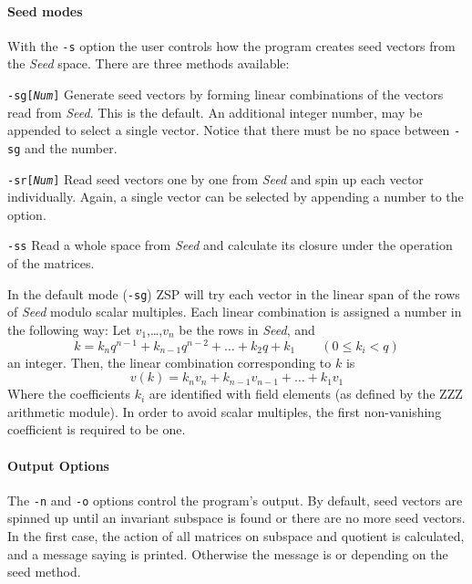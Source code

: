 \paragraph{Seed modes}
With the {\tt -s} option the user controls how the program creates
seed vectors from the {\it Seed} space. There are three methods
available:
\begin{list}{}{ \leftmargin 17mm 
\parsep 0mm\itemsep 0mm}
\item[{\tt -sg[{\it Num}]}]
	Generate seed vectors by forming linear combinations of the
	vectors read from {\it Seed}. This is the default.
	An additional integer number, may be appended to select
	a single vector. Notice that there must be no space
	between {\tt -sg} and the number.
\item[{\tt -sr[{\it Num}]}]
	Read seed vectors one by one from {\it Seed} and spin up
	each vector individually. Again, a single vector can be
	selected by appending a number to the option.
\item[{\tt -ss}]
	Read a whole space from {\it Seed} and calculate its closure
	under the operation of the matrices.
\end{list}
In the default mode ({\tt -sg}) ZSP will try each vector in the
linear span of the rows of {\it Seed} modulo scalar multiples.
Each linear combination is assigned a number in the following way:
Let $v_1$,\ldots,$v_n$ be the rows in {\it Seed}, and
\[
	k = k_nq^{n-1} + k_{n-1}q^{n-2} + \ldots + k_2q + k_1
	\qquad(0\leq k_i<q)
\]
an integer. Then, the linear combination corresponding to $k$ is
\[
	v(k) = k_nv_n + k_{n-1}v_{n-1} + \ldots + k_1v_1
\]
Where the coefficients $k_i$ are identified with field elements
(as defined by the ZZZ arithmetic module). In order to avoid scalar
multiples, the first non-vanishing coefficient is required to be one.


\paragraph{Output Options}
The {\tt -n} and {\tt -o} options control the program's output.
By default, seed vectors are spinned up until an invariant
subspace is found or there are no more seed vectors. In the
first case, the action of all matrices on subspace and quotient
is calculated, and a message saying
is printed. Otherwise the message is
or
depending on the seed method.

